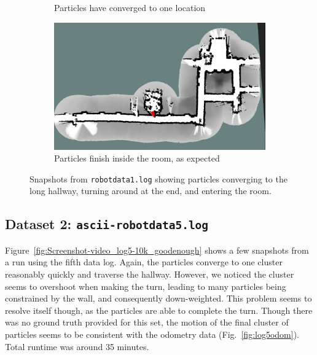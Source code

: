 \begin{figure}
\begin{subfigure}[b]{0.49\textwidth}
\caption{Particles have converged to one location}
\label{fig:Screenshot-video_log1-10k_good-3}
\end{subfigure}
\begin{subfigure}[b]{0.49\textwidth}
\includegraphics[width=\linewidth]{figures/Screenshot-video_log1-10k_good-4}
\caption{Particles finish inside the room, as expected}
\label{fig:Screenshot-video_log1-10k_good-4}
\end{subfigure}
\caption{Snapshots from \texttt{robotdata1.log} showing particles converging to the long hallway, turning around at the end, and entering the room.
\label{fig:Screenshot-video_log1-10k_good}}
\end{figure}



\subsection{Dataset 2: \texttt{ascii-robotdata5.log}}

Figure~\ref{fig:Screenshot-video_log5-10k_goodenough} shows a few snapshots from a run using the fifth data log. Again, the particles converge to one cluster reasonably quickly and traverse the hallway. However, we noticed the cluster seems to overshoot when making the turn, leading to many particles being constrained by the wall, and consequently down-weighted. This problem seems to resolve itself though, as the particles are able to complete the turn. Though there was no ground truth provided for this set, the motion of the final cluster of particles seems to be consistent with the odometry data (Fig.~\ref{fig:log5odom}). Total runtime was around 35 minutes.


